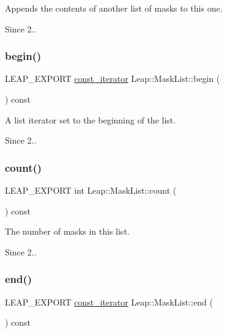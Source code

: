 Appends the contents of another list of masks to this one. \begin{DoxySince}{Since}
2.. 
\end{DoxySince}
\mbox{\label{class_leap_1_1_mask_list_ae29ce07a589fe2b48a5e19368198668d}} 
\subsubsection{\texorpdfstring{begin()}{begin()}}
{\footnotesize\ttfamily L\+E\+A\+P\+\_\+\+E\+X\+P\+O\+RT \hyperlink{class_leap_1_1_const_list_iterator}{const\+\_\+iterator} Leap\+::\+Mask\+List\+::begin (\begin{DoxyParamCaption}{ }\end{DoxyParamCaption}) const}

A list iterator set to the beginning of the list. \begin{DoxySince}{Since}
2.. 
\end{DoxySince}
\mbox{\label{class_leap_1_1_mask_list_a768de3705c97cc0ddf5e03c4776123d6}} 
\subsubsection{\texorpdfstring{count()}{count()}}
{\footnotesize\ttfamily L\+E\+A\+P\+\_\+\+E\+X\+P\+O\+RT int Leap\+::\+Mask\+List\+::count (\begin{DoxyParamCaption}{ }\end{DoxyParamCaption}) const}

The number of masks in this list. \begin{DoxySince}{Since}
2.. 
\end{DoxySince}
\mbox{\label{class_leap_1_1_mask_list_a1decd80ee1b76ee7bf7f4ed832c2bf19}} 
\subsubsection{\texorpdfstring{end()}{end()}}
{\footnotesize\ttfamily L\+E\+A\+P\+\_\+\+E\+X\+P\+O\+RT \hyperlink{class_leap_1_1_const_list_iterator}{const\+\_\+iterator} Leap\+::\+Mask\+List\+::end (\begin{DoxyParamCaption}{ }\end{DoxyParamCaption}) const}

